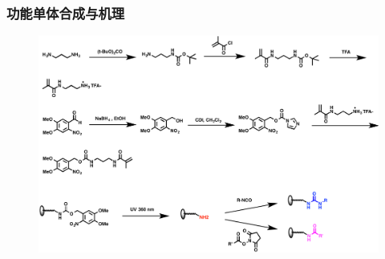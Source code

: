 \documentclass{beamer}
\begin{document}
\begin{frame}
  \frametitle{功能单体合成与机理}
  \begin{figure}[h]
    \centering
    \includegraphics[width=0.95\linewidth]{figures/scheme-NVOC.png}
  \end{figure}
  
\end{frame}
\end{document}

